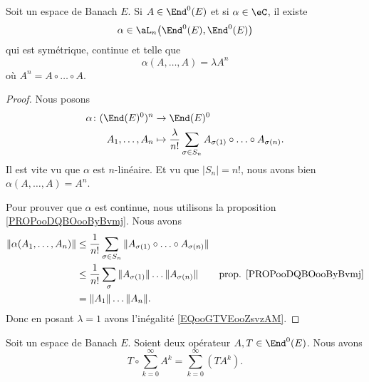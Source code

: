\begin{proposition}	\label{PROPooGCLEooBVPHcu}
	Soit un espace de Banach \( E\). Si \( A\in \End^0(E)\) et si \( \alpha\in\eC \), il existe
	\begin{equation}
		\alpha\in\aL_n\big( \End^0(E),\End^0(E) \big)
	\end{equation}
	qui est symétrique, continue et telle que
	\begin{equation}
		\alpha(A,\ldots,A)=\lambda A^n
	\end{equation}
	où \( A^n=A\circ\ldots\circ A\).
\end{proposition}

\begin{proof}
	Nous posons
	\begin{equation}
		\begin{aligned}
			\alpha\colon (\End(E)^0)^n & \to \End(E)^0                                                                               \\
			A_1,\ldots,A_n             & \mapsto \frac{\lambda}{ n!}\sum_{\sigma\in S_n}A_{\sigma(1)}\circ\ldots\circ A_{\sigma(n)}.
		\end{aligned}
	\end{equation}
	Il est vite vu que \( \alpha\) est \( n\)-linéaire. Et vu que \( | S_n |=n!\), nous avons bien \( \alpha(A,\ldots,A)=A^n\).

	Pour prouver que \( \alpha\) est continue, nous utilisons la proposition \ref{PROPooDQBOooByBvmj}. Nous avons
	\begin{subequations}
		\begin{align}
			\| \alpha(A_1,\ldots,A_n) \| & \leq\frac{1}{ n!}\sum_{\sigma\in S_n}\| A_{\sigma(1)}\circ\ldots\circ A_{\sigma(n)} \|                                         \\
			                             & \leq \frac{1}{ n!}\sum_{\sigma}\| A_{\sigma(1)} \|\ldots \| A_{\sigma(n)} \|           & \text{prop. \ref{PROPooDQBOooByBvmj}} \\
			                             & =\| A_1 \|\ldots\| A_n \|.
		\end{align}
	\end{subequations}
	Donc en posant \( \lambda=1\) avons l'inégalité \eqref{EQooGTVEooZsvzAM}.
\end{proof}


\begin{proposition}	\label{PROPooKZNWooLdjDTP}
	Soit un espace de Banach \( E\). Soient deux opérateur \( A,T\in\End^0(E)\). Nous avons
	\begin{equation}
		T\circ\sum_{k=0}^{\infty}A^k=\sum_{k=0}^{\infty}(TA^k).
	\end{equation}
\end{proposition}

